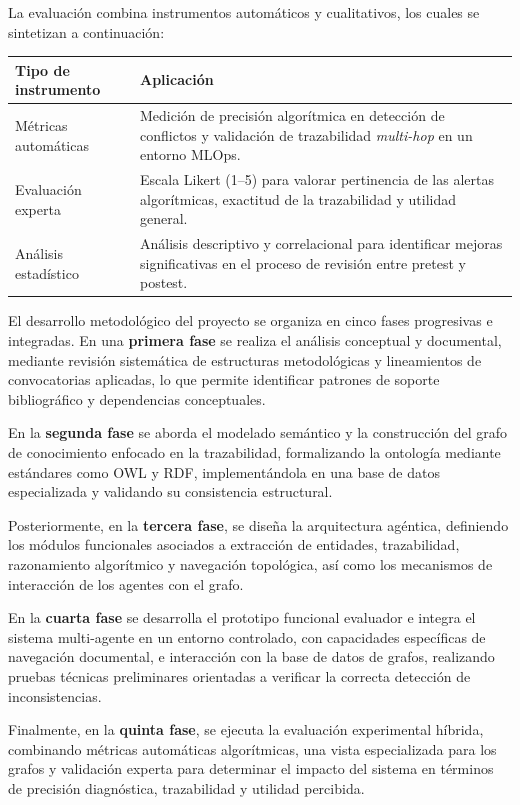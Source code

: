 \documentclass[12pt,letterpaper]{article}
\begin{document}
La evaluación combina instrumentos automáticos y cualitativos, los cuales se sintetizan a continuación:

\begin{table}[H]
\centering
\begin{tabular}{|p{4cm}|p{9cm}|}
\hline
\textbf{Tipo de instrumento} & \textbf{Aplicación} \\ \hline
Métricas automáticas & Medición de precisión algorítmica en detección de conflictos y validación de trazabilidad \textit{multi-hop} en un entorno MLOps. \\ \hline
Evaluación experta & Escala Likert (1–5) para valorar pertinencia de las alertas algorítmicas, exactitud de la trazabilidad y utilidad general. \\ \hline
Análisis estadístico & Análisis descriptivo y correlacional para identificar mejoras significativas en el proceso de revisión entre pretest y postest. \\ \hline
\end{tabular}
\end{table}

El desarrollo metodológico del proyecto se organiza en cinco fases progresivas e integradas. En una \textbf{primera fase} se realiza el análisis conceptual y documental, mediante revisión sistemática de estructuras metodológicas y lineamientos de convocatorias aplicadas, lo que permite identificar patrones de soporte bibliográfico y dependencias conceptuales. 

En la \textbf{segunda fase} se aborda el modelado semántico y la construcción del grafo de conocimiento enfocado en la trazabilidad, formalizando la ontología mediante estándares como OWL y RDF, implementándola en una base de datos especializada y validando su consistencia estructural.

Posteriormente, en la \textbf{tercera fase}, se diseña la arquitectura agéntica, definiendo los módulos funcionales asociados a extracción de entidades, trazabilidad, razonamiento algorítmico y navegación topológica, así como los mecanismos de interacción de los agentes con el grafo.

En la \textbf{cuarta fase} se desarrolla el prototipo funcional evaluador e integra el sistema multi-agente en un entorno controlado, con capacidades específicas de navegación documental, e interacción con la base de datos de grafos, realizando pruebas técnicas preliminares orientadas a verificar la correcta detección de inconsistencias.

Finalmente, en la \textbf{quinta fase}, se ejecuta la evaluación experimental híbrida, combinando métricas automáticas algorítmicas, una vista especializada para los grafos y validación experta para determinar el impacto del sistema en términos de precisión diagnóstica, trazabilidad y utilidad percibida.
\end{document}
